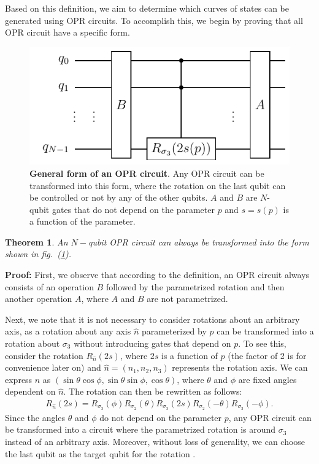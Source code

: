\documentclass[10pt,letterpaper]{article} %
\newtheorem{theorem}{Theorem}
\begin{document}
Based on this definition, we aim to determine which curves of 
states can be generated using OPR  circuits. 
To accomplish this, we begin by proving that all OPR circuit have 
a specific form.

\begin{figure} %
\centering
\includegraphics{images/OPR-circuit.pdf}
\caption{\textbf{General form of an OPR circuit}.
Any OPR circuit can be transformed into this form,
where the rotation on the last qubit
can be controlled or not by any of the other qubits.
$A$ and $B$
are $N$-qubit gates that do not depend on the parameter $p$ and
$s= s(p)$ is a function of the parameter.
}
\label{fig:OPR-circuit}
\end{figure} %

\begin{theorem}
An $N-$qubit OPR circuit can always be transformed into the form shown in
fig.~(\ref{fig:OPR-circuit}).
\end{theorem}
\textbf{Proof:} 
First, we observe that according to the
definition, an OPR circuit always consists of an operation $B$ followed 
by the parametrized rotation and then another operation $A$, 
where $A$ and $B$ are not parametrized.

Next, we note that it is not necessary to consider rotations about an arbitrary axis,
as a rotation about any axis $\hat{n}$ parameterized by $p$
can be transformed into a rotation about $\sigma_3$ without introducing 
gates that depend on $p$. To see this, consider the rotation $R_{\hat{n}}(2s)$, where $2s$ 
is a function of $p$ (the factor of 2 is for convenience later on) 
and $\hat{n} = (n_1,n_2,n_3)$ represents the rotation axis. 
We can express $\hat{n}$ as $(\sin \theta \cos \phi, \sin \theta \sin \phi, \cos \theta)$, 
where $\theta$ and $\phi$ are fixed angles dependent on $\hat{n}$. 
The rotation can then be rewritten as follows:
\begin{eqnarray}
R_{\hat{n}}(2s) = R_{\sigma_3}(\phi) R_{\sigma_2}(\theta) R_{\sigma_3}(2s) R_{\sigma_2}(-\theta) R_{\sigma_3}(-\phi).
\end{eqnarray}
Since the angles $\theta$ and $\phi$ do not depend on the parameter $p$,
any OPR circuit can be transformed into a circuit where the parametrized
 rotation is around $\sigma_3$ instead of an arbitrary axis. 
Moreover, without loss of generality, we can choose the last qubit as the
target qubit for the rotation .
\end{document}
